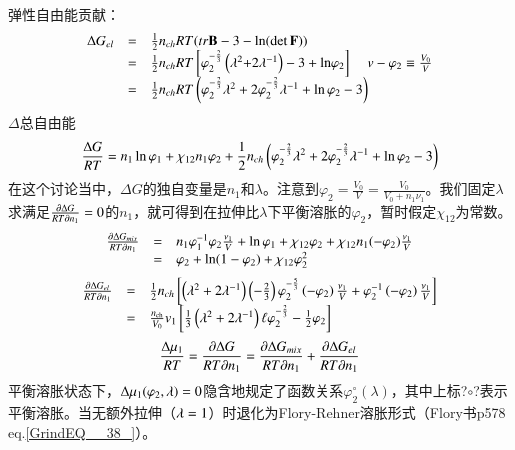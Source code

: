 \documentclass{article} %
\begin{document}
\noindent 弹性自由能贡献：
\[\begin{array}{rcl} {{\rm \Delta }G_{el} } & {=} & {\frac{1}{2} n_{ch} RT(tr\boldsymbol{\mathrm{B}}-3-\ln (\det \boldsymbol{\mathrm{F}}))} \\ {} & {=} & {\frac{1}{2} n_{ch} RT\left[\varphi _{{\rm 2}}^{-\frac{{\rm 2}}{{\rm 3}} } \left(\lambda ^{{\rm 2}} {\rm +2}\lambda ^{-{\rm 1}} \right)-{\rm 3}+{\rm ln}\varphi _{{\rm 2}} \right]\; \; \; \; v-\varphi _{{\rm 2}} \equiv \frac{V_{0} }{V} } \\ {} & {=} & {\frac{1}{2} n_{ch} RT\left(\varphi _{2}^{-\frac{2}{3} } \lambda ^{2} +2\varphi _{2}^{-\frac{2}{3} } \lambda ^{-1} +\ln \varphi _{2} -3\right)} \end{array}\] 
$\Delta$总自由能
\[\frac{{\rm \Delta }G}{RT} =n_{1} \ln \varphi _{1} +\chi _{12} n_{1} \varphi _{2} +\frac{1}{2} n_{ch} \left(\varphi _{2}^{-\frac{2}{3} } \lambda ^{2} +2\varphi _{2}^{-\frac{2}{3} } \lambda ^{-1} +\ln \varphi _{2} -3\right)\] 
在这个讨论当中，$\Delta G$的独自变量是$n_{1} $和$\lambda $。注意到$\varphi _{2} =\frac{V_{0} }{V} =\frac{V_{0} }{V_{0} +n_{1} \nu _{1} } $。我们固定$\lambda $求满足$\frac{\partial {\rm \Delta }G}{RT\partial n_{1} } =0$的$n_{1} $，就可得到在拉伸比$\lambda $下平衡溶胀的$\varphi _{2} $，暂时假定$\chi _{12} $为常数。
\[\begin{array}{rcl} {\frac{\partial {\rm \Delta }G_{mix} }{RT\partial n_{1} } } & {=} & {n_{1} \varphi _{1}^{-1} \varphi _{2} \frac{\nu _{1} }{V} +\ln \varphi _{1} +\chi _{12} \varphi _{2} +\chi _{12} n_{1} (-\varphi _{2} )\frac{\nu _{1} }{V} } \\ {} & {=} & {\varphi _{2} +\ln (1-\varphi _{2} )+\chi _{12} \varphi _{2}^{2} } \end{array}\] 
\[\begin{array}{rcl} {\frac{\partial {\rm \Delta }G_{el} }{RT\partial n_{1} } } & {=} & {\frac{1}{2} n_{ch} \left[\left(\lambda ^{2} +2\lambda ^{-1} \right)\left(-\frac{2}{3} \right)\varphi _{2}^{-\frac{5}{3} } \left(-\varphi _{2} \right)\frac{\nu _{1} }{V} +\varphi _{2}^{-1} \left(-\varphi _{2} \right)\frac{\nu _{1} }{V} \right]} \\ {} & {=} & {\frac{n_{{\rm ch}} }{V_{0} } v_{1} \left[\frac{1}{3} \left(\lambda ^{2} +2\lambda ^{-1} \right)\ell \varphi _{2}^{-\frac{2}{3} } -\frac{1}{2} \varphi _{2} \right]} \end{array}\] 
\[\frac{{\rm \Delta }\mu _{1} }{RT} =\frac{\partial {\rm \Delta }G}{RT\partial n_{1} } =\frac{\partial {\rm \Delta }G_{mix} }{RT\partial n_{1} } +\frac{\partial {\rm \Delta }G_{el} }{RT\partial n_{1} } \] 
平衡溶胀状态下，${\rm \Delta }\mu _{1} (\varphi _{2} ,\lambda )=0$隐含地规定了函数关系$\varphi _{2}^{\circ } (\lambda )$，其中上标?$\circ $?表示平衡溶胀。当无额外拉伸（$\lambda ={\rm 1}$）时退化为Flory-Rehner溶胀形式（Flory书p578 eq.\eqref{GrindEQ__38_}）。
\end{document}
